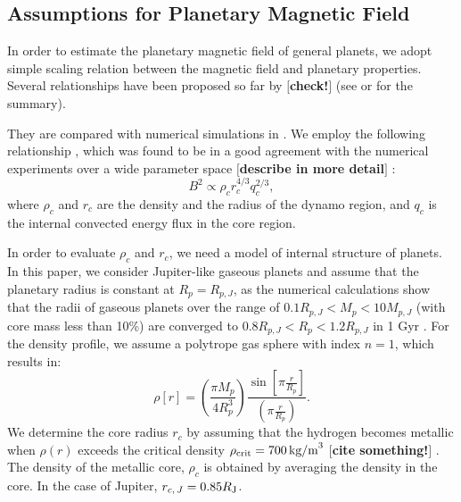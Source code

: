 \documentclass{emulateapj}
\def\memoYF#1{\color{red}$[${\bf #1}$]$ \color{black}}
\begin{document}
\subsection{Assumptions for Planetary Magnetic Field}
\label{ss:magneticfield}

In order to estimate the planetary magnetic field of general planets, we adopt simple scaling relation between the magnetic field and planetary properties. 
Several relationships have been proposed so far by \citep[e.g.][]{russel1978,busse1976,stevenson1979,mizutani1992,sano1993,starchenko2002,christensen2006} \memoYF{check!} (see \citet{griebmeier2004} or \citet{christensen2010} for the summary). 

They are compared with numerical simulations in \citep{christensen2010}. We employ the following relationship \citep{christensen2006}, which was found to be in a good agreement with the numerical experiments over a wide parameter space \memoYF{describe in more detail}:
\begin{equation}
B^2 \propto \rho_c r_c^{4/3} q_c^{2/3}, \label{eq:Bscaling} %
\end{equation}
where $\rho _c$ and $r_c$ are the density and the radius of the dynamo region, and $q_c$ is the internal convected energy flux in the core region. 

In order to evaluate $\rho _c $ and $r_c$, we need a model of internal structure of planets. 
In this paper, we consider Jupiter-like gaseous planets and assume that the planetary radius is constant at $R_p = R_{p,J}$, as the numerical calculations show that the radii of gaseous planets over the range of $0.1 R_{p, J} < M_p < 10M_{p, J}$ (with core mass less than 10\%) are converged to $0.8 R_{p, J} < R_p < 1.2R_{p, J}$ in 1 Gyr \citep{fortney2007, spiegel+burrows2012}.
For the density profile, we assume a polytrope gas sphere with index $n=1$, which results in:
\begin{equation}
\rho [r] = \left( \frac{\pi M_p}{4 R_p^3} \right) \frac{\sin \left[ \pi \frac{r}{R_p} \right]}{\left( \pi \frac{r}{R_p} \right)}. \label{eq:rho_r}
\end{equation}
We determine the core radius $r_c$ by assuming that the hydrogen becomes metallic when $\rho (r)$ exceeds the critical density $\rho_{\rm crit}=700\,\mbox{kg/m}^3$ \memoYF{cite something!}. The density of the metallic core, $\rho _c$ is obtained by averaging the density in the core. 
In the case of Jupiter, $r_{c,\,J} = 0.85 R_{\rm J}$. 
\end{document}
